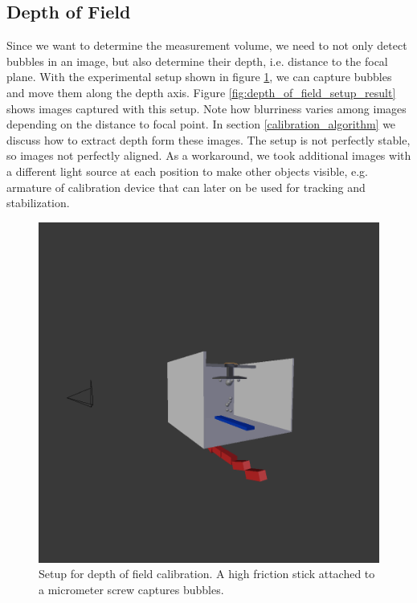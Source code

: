 		\subsection{Depth of Field}\label{sub:depth_of_field_setup}
			Since we want to determine the measurement volume, we need to not only detect bubbles in an image, but also determine their depth, i.e. distance to the focal plane. With the experimental setup shown in figure \ref{fig:depth_of_field_setup}, we can capture bubbles and move them along the depth axis. 
			Figure \ref{fig:depth_of_field_setup_result} shows images captured with this setup. Note how blurriness varies among images depending on the distance to focal point. In section \ref{calibration_algorithm} we discuss how to extract depth form these images. The setup is not perfectly stable, so images not perfectly aligned. As a workaround, we took additional images with a different light source at each position to make other objects visible, e.g. armature of calibration device that can later on be used for tracking and stabilization. 
			
			
			\begin{figure}
				\centering
				\includegraphics[scale=.2]{images/depth_of_field_setup.png}
				\caption{Setup for depth of field calibration. A high friction stick attached to a micrometer screw captures bubbles. }
				\label{fig:depth_of_field_setup}
			\end{figure}
			
